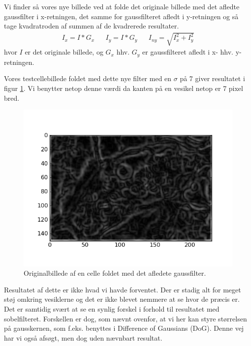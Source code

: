 Vi finder så vores nye billede ved at folde det originale billede med det afledte gaussfilter i x-retningen, det samme for gaussfilteret afledt i y-retningen og så tage kvadratroden af summen af de kvadrerede resultater.
\begin{align}
	I_x = I * G_x && I_y = I * G_y && I_{ny} = \sqrt{I_x^2+I_y^2}
\end{align} 
hvor $I$ er det originale billede, og $G_x$ hhv. $G_y$ er gaussfilteret afledt i x- hhv. y-retningen.

Vores testcellebillede foldet med dette nye filter med en $\sigma$ på 7 giver resultatet i figur \ref{fig:premethod_gaussCell}. Vi benytter netop denne værdi da kanten på en vesikel netop er 7 pixel bred.
\begin{figure}[H]
	\centering
	\includegraphics[scale=0.8]{files/premethod/img/gauss_derived_cell2.png}
	\caption{Originalbillede af en celle foldet med det afledete gaussfilter.\label{fig:premethod_gaussCell}}
\end{figure}

Resultatet af dette er ikke hvad vi havde forventet. Der er stadig alt for meget støj omkring vesiklerne og det er ikke blevet nemmere at se hvor de præcis er. Det er samtidig svært at se en synlig forskel i forhold til resultatet med sobelfilteret. Forskellen er dog, som nævnt ovenfor, at vi her kan styre størrelsen på gausskernen, som f.eks. benyttes i Difference of Gaussians (DoG). Denne vej har vi også afsøgt, men dog uden nævnbart resultat. 


